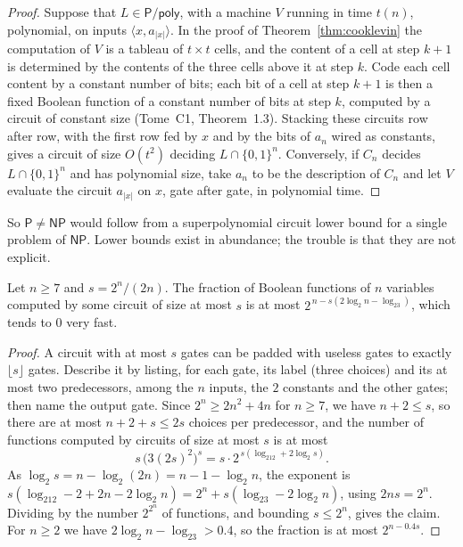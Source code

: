\begin{proof}
Suppose that $L\in\mathsf P/\mathsf{poly}$, with a machine $V$ running in time $t(n)$, polynomial, on inputs $\langle x,a_{|x|}\rangle$. In the proof of Theorem~\ref{thm:cooklevin} the computation of $V$ is a tableau of $t\times t$ cells, and the content of a cell at step $k+1$ is determined by the contents of the three cells above it at step $k$. Code each cell content by a constant number of bits; each bit of a cell at step $k+1$ is then a fixed Boolean function of a constant number of bits at step $k$, computed by a circuit of constant size (Tome~C1, Theorem~1.3). Stacking these circuits row after row, with the first row fed by $x$ and by the bits of $a_n$ wired as constants, gives a circuit of size $O(t^2)$ deciding $L\cap\{0,1\}^n$. Conversely, if $C_n$ decides $L\cap\{0,1\}^n$ and has polynomial size, take $a_n$ to be the description of $C_n$ and let $V$ evaluate the circuit $a_{|x|}$ on $x$, gate after gate, in polynomial time.
\end{proof}

So $\mathsf P\ne\mathsf{NP}$ would follow from a superpolynomial circuit lower bound for a single problem of $\mathsf{NP}$. Lower bounds exist in abundance; the trouble is that they are not explicit.

\begin{theorem}[Shannon 1949]\label{thm:shannon}
Let $n\ge7$ and $s=2^n/(2n)$. The fraction of Boolean functions of $n$ variables computed by some circuit of size at most $s$ is at most $2^{\,n-s(2\log_2n-\log_23)}$, which tends to $0$ very fast.
\end{theorem}

\begin{proof}
A circuit with at most $s$ gates can be padded with useless gates to exactly $\lfloor s\rfloor$ gates. Describe it by listing, for each gate, its label (three choices) and its at most two predecessors, among the $n$ inputs, the $2$ constants and the other gates; then name the output gate. Since $2^n\ge2n^2+4n$ for $n\ge7$, we have $n+2\le s$, so there are at most $n+2+s\le2s$ choices per predecessor, and the number of functions computed by circuits of size at most $s$ is at most
\[
s\,\bigl(3(2s)^2\bigr)^{s}=s\cdot2^{\,s(\log_212+2\log_2s)}.
\]
As $\log_2s=n-\log_2(2n)=n-1-\log_2n$, the exponent is $s(\log_212-2+2n-2\log_2n)=2^n+s(\log_23-2\log_2n)$, using $2ns=2^n$. Dividing by the number $2^{2^n}$ of functions, and bounding $s\le2^n$, gives the claim. For $n\ge2$ we have $2\log_2n-\log_23>0.4$, so the fraction is at most $2^{n-0.4s}$.
\end{proof}

